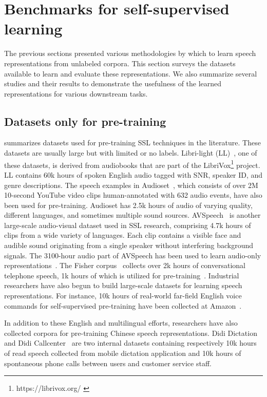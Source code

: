 
\section{Benchmarks for self-supervised learning}
\label{section:benchmark}

The previous sections presented various methodologies by which to learn speech
representations from unlabeled corpora. This section surveys the datasets
available to learn and evaluate these representations. We also summarize
several studies and their results to demonstrate the usefulness of the learned
representations for various downstream tasks. 

\subsection{Datasets only for pre-training} 
 summarizes datasets used for pre-training SSL techniques
in the literature. These datasets are usually large but with limited or no
labels. Libri-light (LL)~\cite{kahn_libri-light_2020}, one of these datasets, is
derived from audiobooks that are part of the
LibriVox\footnote{https://librivox.org/ \label{librivox}} project. LL contains
60k hours of spoken English audio tagged with SNR, speaker ID, and genre
descriptions. The speech examples in Audioset~\cite{gemmeke_audio_2017}, which
consists of over 2M 10-second YouTube video clips human-annotated with 632
audio events, have also been used for pre-training. Audioset has 2.5k hours
of audio of varying quality, different languages, and sometimes multiple sound
sources. AVSpeech~\cite{ephrat_looking_2018} is another large-scale audio-visual
dataset used in SSL research, comprising 4.7k hours of clips from a wide
variety of languages. 
Each clip contains a visible face and audible sound originating from a single
speaker without interfering background signals. The 3100-hour audio part of
AVSpeech has been used to learn audio-only 
representations~\cite{kawakami_learning_2020}. The Fisher corpus~\cite{cieri_fisher_2004} collects
over 2k hours of conversational telephone speech, 1k hours of which is utilized
for pre-training~\cite{jiang_further_2021}. Industrial researchers have also
begun to build large-scale datasets for learning speech representations.
For instance, 10k hours of real-world far-field English voice commands for
self-supervised pre-training have been collected at 
Amazon~\cite{sadhu_wav2vec-c_2021}. 

In addition to these English and multilingual efforts, researchers have also
collected corpora for pre-training Chinese speech representations. Didi Dictation
and Didi Callcenter~\cite{jiang_improving_2019, jiang_further_2021} are two
internal datasets containing respectively 10k hours of read speech collected
from mobile dictation application and 10k hours of spontaneous phone calls
between users and customer service staff.

